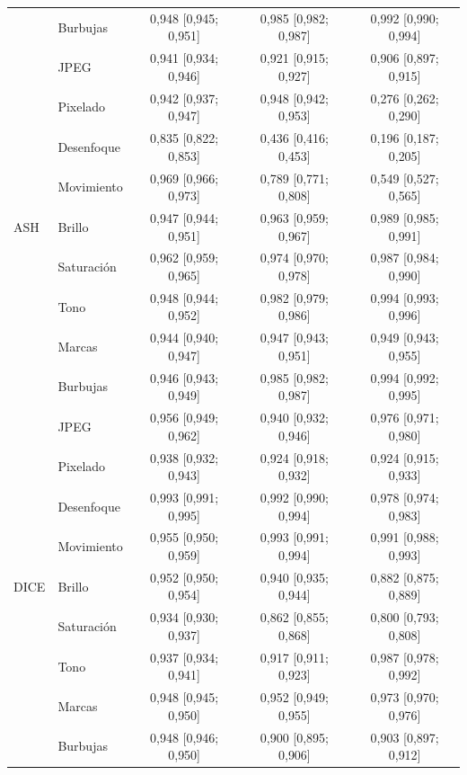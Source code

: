 {\begin{longtable}{llccc}
 & Burbujas & 0{,}948 [0{,}945; 0{,}951] & 0{,}985 [0{,}982; 0{,}987] & 0{,}992 [0{,}990; 0{,}994] \\
 & JPEG & 0{,}941 [0{,}934; 0{,}946] & 0{,}921 [0{,}915; 0{,}927] & 0{,}906 [0{,}897; 0{,}915] \\
 & Pixelado & 0{,}942 [0{,}937; 0{,}947] & 0{,}948 [0{,}942; 0{,}953] & 0{,}276 [0{,}262; 0{,}290] \\
 & Desenfoque & 0{,}835 [0{,}822; 0{,}853] & 0{,}436 [0{,}416; 0{,}453] & 0{,}196 [0{,}187; 0{,}205] \\
 & Movimiento & 0{,}969 [0{,}966; 0{,}973] & 0{,}789 [0{,}771; 0{,}808] & 0{,}549 [0{,}527; 0{,}565] \\
\midrule
ASH & Brillo & 0{,}947 [0{,}944; 0{,}951] & 0{,}963 [0{,}959; 0{,}967] & 0{,}989 [0{,}985; 0{,}991] \\
 & Saturación & 0{,}962 [0{,}959; 0{,}965] & 0{,}974 [0{,}970; 0{,}978] & 0{,}987 [0{,}984; 0{,}990] \\
 & Tono & 0{,}948 [0{,}944; 0{,}952] & 0{,}982 [0{,}979; 0{,}986] & 0{,}994 [0{,}993; 0{,}996] \\
 & Marcas & 0{,}944 [0{,}940; 0{,}947] & 0{,}947 [0{,}943; 0{,}951] & 0{,}949 [0{,}943; 0{,}955] \\
 & Burbujas & 0{,}946 [0{,}943; 0{,}949] & 0{,}985 [0{,}982; 0{,}987] & 0{,}994 [0{,}992; 0{,}995] \\
 & JPEG & 0{,}956 [0{,}949; 0{,}962] & 0{,}940 [0{,}932; 0{,}946] & 0{,}976 [0{,}971; 0{,}980] \\
 & Pixelado & 0{,}938 [0{,}932; 0{,}943] & 0{,}924 [0{,}918; 0{,}932] & 0{,}924 [0{,}915; 0{,}933] \\
 & Desenfoque & 0{,}993 [0{,}991; 0{,}995] & 0{,}992 [0{,}990; 0{,}994] & 0{,}978 [0{,}974; 0{,}983] \\
 & Movimiento & 0{,}955 [0{,}950; 0{,}959] & 0{,}993 [0{,}991; 0{,}994] & 0{,}991 [0{,}988; 0{,}993] \\
\midrule
DICE & Brillo & 0{,}952 [0{,}950; 0{,}954] & 0{,}940 [0{,}935; 0{,}944] & 0{,}882 [0{,}875; 0{,}889] \\
 & Saturación & 0{,}934 [0{,}930; 0{,}937] & 0{,}862 [0{,}855; 0{,}868] & 0{,}800 [0{,}793; 0{,}808] \\
 & Tono & 0{,}937 [0{,}934; 0{,}941] & 0{,}917 [0{,}911; 0{,}923] & 0{,}987 [0{,}978; 0{,}992] \\
 & Marcas & 0{,}948 [0{,}945; 0{,}950] & 0{,}952 [0{,}949; 0{,}955] & 0{,}973 [0{,}970; 0{,}976] \\
 & Burbujas & 0{,}948 [0{,}946; 0{,}950] & 0{,}900 [0{,}895; 0{,}906] & 0{,}903 [0{,}897; 0{,}912] \\

\end{longtable}}
